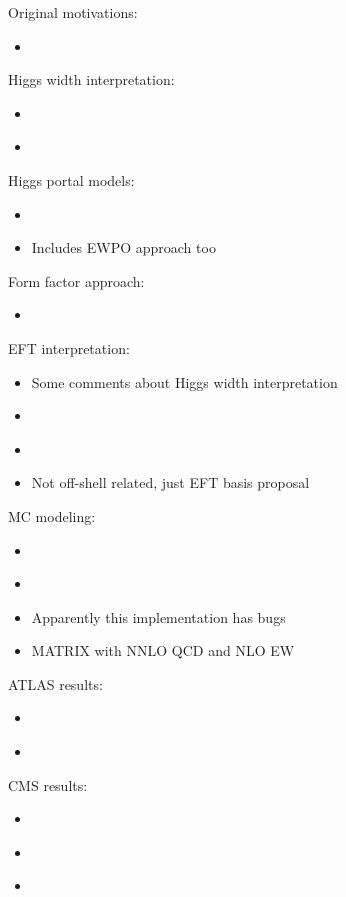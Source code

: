 \documentclass[11pt,letterpaper]{article}
\begin{document}
Original motivations:
\begin{itemize}
  \item \cite{Kauer:2012hd} 
\end{itemize}

Higgs width interpretation:
\begin{itemize}  
  \item \cite{Caola:2013yja}
  \item \cite{Campbell:2013una}
\end{itemize}

Higgs portal models:
\begin{itemize}
  \item \cite{Goncalves:2017iub} 
  \item \cite{Englert:2020gcp} Includes EWPO approach too
\end{itemize}

Form factor approach:
\begin{itemize}
  \item \cite{Goncalves:2018pkt}
\end{itemize}

EFT interpretation:
\begin{itemize}
  \item \cite{Azatov:2014jga} Some comments about Higgs width interpretation
  \item \cite{Azatov:2016xik}
  \item \cite{Contino:2016jqw}
  \item \cite{Falkowski:2001958} Not off-shell related, just EFT basis proposal
\end{itemize}

MC modeling:
\begin{itemize}
  \item \cite{Caola:2015psa}
  \item \cite{Caola:2016trd}
  \item \cite{Alioli:2016xab} Apparently this implementation has bugs
  \item \cite{Kallweit:2019zez} MATRIX with NNLO QCD and NLO EW
\end{itemize}

ATLAS results:
\begin{itemize}
  \item \cite{Aad:2015xua}
  \item \cite{Aaboud:2018puo}
\end{itemize}

CMS results:
\begin{itemize}
  \item \cite{Khachatryan:2014iha}
  \item \cite{Khachatryan:2016ctc}
  \item \cite{Sirunyan:2019twz}
\end{itemize}
\end{document}
